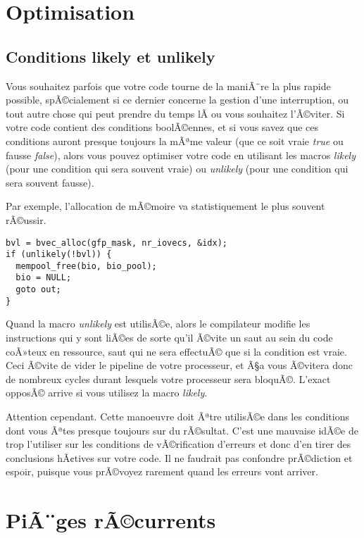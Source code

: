 \documentclass[11pt]{article}
\begin{document}
\section*{Optimisation}
\label{sec-18}

\subsection*{Conditions likely et unlikely}
\label{sec-18-1}

Vous souhaitez parfois que votre code tourne de la maniÃ¨re la plus rapide possible, spÃ©cialement si ce dernier concerne la gestion d'une interruption, ou tout autre chose qui peut prendre du temps lÃ  ou vous souhaitez l'Ã©viter. Si votre code contient des conditions boolÃ©ennes, et si vous savez que ces conditions auront presque toujours la mÃªme valeur (que ce soit vraie \emph{true} ou fausse \emph{false}), alors vous pouvez optimiser votre code en utilisant les macros \emph{likely} (pour une condition qui sera souvent vraie) ou \emph{unlikely} (pour une condition qui sera souvent fausse).

Par exemple, l'allocation de mÃ©moire va statistiquement le plus souvent  rÃ©ussir.

\begin{verbatim}
bvl = bvec_alloc(gfp_mask, nr_iovecs, &idx);
if (unlikely(!bvl)) {
  mempool_free(bio, bio_pool);
  bio = NULL;
  goto out;
}
\end{verbatim}

Quand la macro \emph{unlikely} est utilisÃ©e, alors le compilateur modifie les instructions qui y sont liÃ©es de sorte qu'il Ã©vite un saut au sein du code coÃ»teux en ressource, saut qui ne sera effectuÃ© que si la condition est vraie. Ceci Ã©vite de vider le pipeline de votre processeur, et Ã§a vous Ã©vitera donc de nombreux cycles durant lesquels votre processeur sera bloquÃ©. L'exact opposÃ© arrive si vous utilisez la macro \emph{likely}.

Attention cependant. Cette manoeuvre doit Ãªtre utilisÃ©e dans les conditions dont vous Ãªtes presque toujours sur du rÃ©sultat. C'est une mauvaise idÃ©e de trop l'utiliser sur les conditions de vÃ©rification d'erreurs et donc d'en tirer des conclusions hÃ¢tives sur votre code. Il ne faudrait pas confondre prÃ©diction et espoir, puisque vous prÃ©voyez rarement quand les erreurs vont arriver.

\section*{PiÃ¨ges rÃ©currents}
\label{sec-19}
\end{document}
